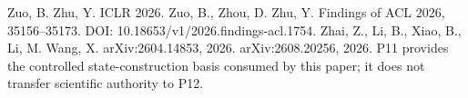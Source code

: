 \markdownRendererDocumentBegin
\markdownRendererSectionBegin
{}\markdownRendererInterblockSeparator
{}\markdownRendererUlBeginTight
\markdownRendererUlItem Zuo, B. \markdownRendererAmpersand{} Zhu, Y.  ICLR 2026.\markdownRendererUlItemEnd 
\markdownRendererUlItem Zuo, B., Zhou, D. \markdownRendererAmpersand{} Zhu, Y.  Findings of ACL 2026, 35156–35173. DOI: 10.18653/v1/2026.findings-acl.1754.\markdownRendererUlItemEnd 
\markdownRendererUlItem Zhai, Z., Li, B., Xiao, B., Li, M. \markdownRendererAmpersand{} Wang, X.  arXiv:2604.14853, 2026.\markdownRendererUlItemEnd 
\markdownRendererUlItem {} arXiv:2608.20256, 2026.\markdownRendererUlItemEnd 
\markdownRendererUlItem P11 provides the controlled state-construction basis consumed by this paper; it does not transfer scientific authority to P12.\markdownRendererUlItemEnd 
\markdownRendererUlEndTight 
\markdownRendererSectionEnd \markdownRendererDocumentEnd